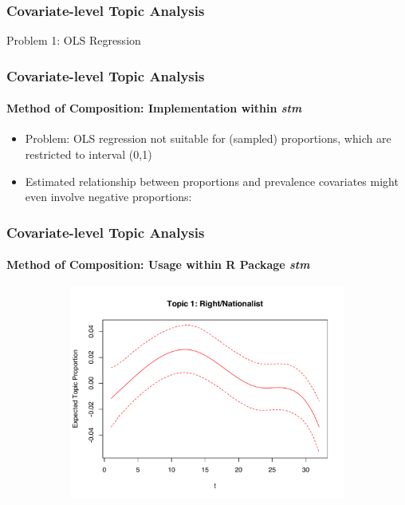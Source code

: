 \documentclass[xcolor=dvipsnames]{beamer}
\begin{document}
\begin{frame}
\frametitle{Covariate-level Topic Analysis}
\begin{center}
Problem 1: OLS Regression
\end{center}
\end{frame}

\begin{frame}
\frametitle{Covariate-level Topic Analysis}
\framesubtitle{Method of Composition: Implementation within \textit{stm}}
\begin{itemize}
\item Problem: OLS regression not suitable for (sampled) proportions, which are restricted to interval (0,1)
\item Estimated relationship between proportions and prevalence covariates might even involve negative proportions:
\end{itemize}
\frametitle{Covariate-level Topic Analysis}
\framesubtitle{Method of Composition: Usage within R Package \textit{stm}}
  \begin{figure}[h!]
  \centering
  \captionsetup{justification=centering,margin=2cm}
  \begin{subfigure}[b]{0.4\linewidth}
    \includegraphics[width=\linewidth]{../plots/presentation/estEffect_topic1.pdf}
  \end{subfigure}
  \begin{subfigure}[b]{0.4\linewidth}

\end{subfigure}
\end{figure}
\end{frame}
\end{document}
